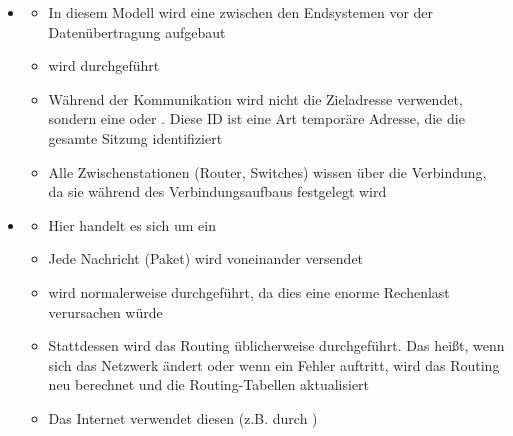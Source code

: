 \begin{itemize}
    \item {}
    \begin{itemize}
        \item In diesem Modell wird eine  zwischen den Endsystemen vor der Datenübertragung aufgebaut
        \item {} wird  durchgeführt
        \item Während der Kommunikation wird nicht die Zieladresse verwendet, sondern eine  oder . Diese ID ist eine Art temporäre Adresse, die die gesamte Sitzung identifiziert
        \item Alle Zwischenstationen (Router, Switches) wissen über die Verbindung, da sie während des Verbindungsaufbaus festgelegt wird
    \end{itemize}
    \item {}
    \begin{itemize}
        \item Hier handelt es sich um ein 
        \item Jede Nachricht (Paket) wird  voneinander versendet
        \item {} wird normalerweise  durchgeführt, da dies eine enorme Rechenlast verursachen würde
        \item Stattdessen wird das Routing üblicherweise  durchgeführt. Das heißt, wenn sich das Netzwerk ändert oder wenn ein Fehler auftritt, wird das Routing neu berechnet und die Routing-Tabellen aktualisiert
        \item Das Internet verwendet diesen  (z.B. durch )
    \end{itemize}
\end{itemize}
